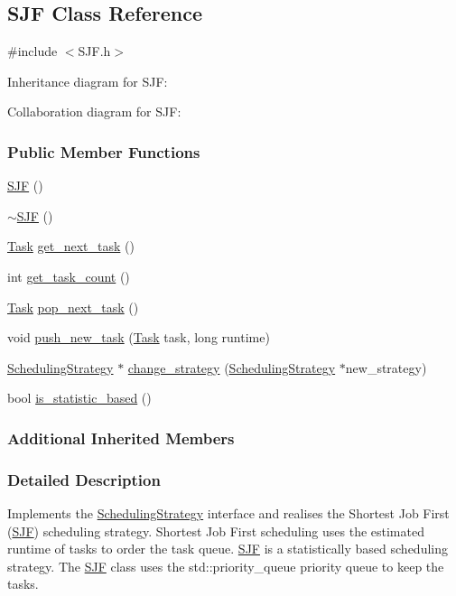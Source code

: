\hypertarget{a00035}{}\subsection{S\+J\+F Class Reference}
\label{a00035}


{\ttfamily \#include $<$S\+J\+F.\+h$>$}



Inheritance diagram for S\+J\+F\+:


Collaboration diagram for S\+J\+F\+:
\subsubsection*{Public Member Functions}
\begin{DoxyCompactItemize}
\item 
\hyperlink{a00035_aad25acf31705ffe3de354d7ed9d246b0}{S\+J\+F} ()
\item 
\hyperlink{a00035_a355e1c11942bdc83724bb522788ef85c}{$\sim$\+S\+J\+F} ()
\item 
\hyperlink{a00002}{Task} \hyperlink{a00035_ae4b4643d0ab5399d9ead911324316f8b}{get\+\_\+next\+\_\+task} ()
\item 
int \hyperlink{a00035_a52050fbf818f6ce0e7de4d206d768af7}{get\+\_\+task\+\_\+count} ()
\item 
\hyperlink{a00002}{Task} \hyperlink{a00035_aa9c95d30d23d76c6738c9b4076574d68}{pop\+\_\+next\+\_\+task} ()
\item 
void \hyperlink{a00035_acf85a4d139f386a2a82578b32a1b3989}{push\+\_\+new\+\_\+task} (\hyperlink{a00002}{Task} task, long runtime)
\item 
\hyperlink{a00033}{Scheduling\+Strategy} $\ast$ \hyperlink{a00035_aa1816e24350bf8ee69641e79bc4354e1}{change\+\_\+strategy} (\hyperlink{a00033}{Scheduling\+Strategy} $\ast$new\+\_\+strategy)
\item 
bool \hyperlink{a00035_a113a0c4ba9bf1ede8e3189c882a7b8c7}{is\+\_\+statistic\+\_\+based} ()
\end{DoxyCompactItemize}
\subsubsection*{Additional Inherited Members}


\subsubsection{Detailed Description}
Implements the \hyperlink{a00033}{Scheduling\+Strategy} interface and realises the Shortest Job First (\hyperlink{a00035}{S\+J\+F}) scheduling strategy. Shortest Job First scheduling uses the estimated runtime of tasks to order the task queue. \hyperlink{a00035}{S\+J\+F} is a statistically based scheduling strategy. The \hyperlink{a00035}{S\+J\+F} class uses the std\+::priority\+\_\+queue priority queue to keep the tasks.


